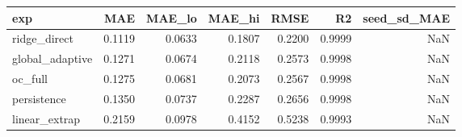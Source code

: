\begin{tabular}{lrrrrrr}
\toprule
exp & MAE & MAE\_lo & MAE\_hi & RMSE & R2 & seed\_sd\_MAE \\
\midrule
ridge\_direct & 0.1119 & 0.0633 & 0.1807 & 0.2200 & 0.9999 & NaN \\
global\_adaptive & 0.1271 & 0.0674 & 0.2118 & 0.2573 & 0.9998 & NaN \\
oc\_full & 0.1275 & 0.0681 & 0.2073 & 0.2567 & 0.9998 & NaN \\
persistence & 0.1350 & 0.0737 & 0.2287 & 0.2656 & 0.9998 & NaN \\
linear\_extrap & 0.2159 & 0.0978 & 0.4152 & 0.5238 & 0.9993 & NaN \\
\bottomrule
\end{tabular}
